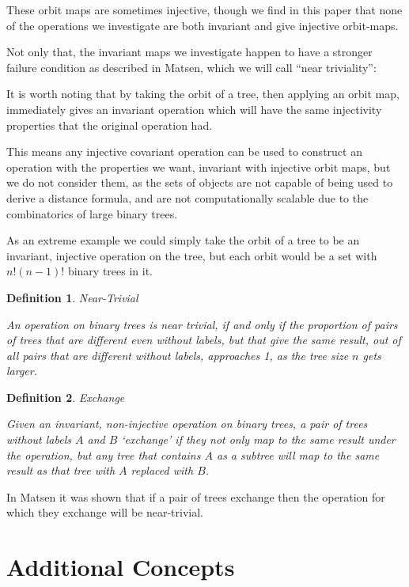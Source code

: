 \documentclass[10pt,a4paper]{report}
\newtheorem{definition}{Definition}
\begin{document}
These orbit maps are sometimes injective, though we find in this paper that
none of the operations we investigate are both invariant and give injective
orbit-maps.

Not only that, the invariant maps we investigate happen to have a stronger
failure condition as described in Matsen, which we will call ``near
triviality'':


It is worth noting that by taking the orbit of a tree, then applying an orbit map, immediately gives an invariant operation which will have the same injectivity properties that the original operation had.

This means any injective covariant operation can be used to construct an operation with the properties we want, invariant with injective orbit maps, but we do not consider them, as the sets of objects are not capable of being used to derive a distance formula, and are not computationally scalable due to the combinatorics of large binary trees.

As an extreme example we could simply take the orbit of a tree to be an invariant, injective operation on the tree, but each orbit would be a set with $n!(n-1)!$ binary trees in it.

\begin{definition} Near-Trivial

	An operation on binary trees is near trivial, if and only if the proportion
	of pairs of trees that are different even without labels, but that give the same result,
	out of all pairs that are different without labels, approaches 1, as the tree
	size $n$ gets larger.
\end{definition}

\begin{definition} Exchange

	Given an invariant, non-injective operation on binary trees, a pair of
	trees without labels $A$ and $B$ `exchange' if they not only map to the same
	result under the operation, but any tree that contains $A$ as a subtree will
	map to the same result as that tree with $A$ replaced with $B$.
\end{definition}

In Matsen it was shown that if a pair of trees exchange then the operation for
which they exchange will be near-trivial.

\section{Additional Concepts}
\end{document}
